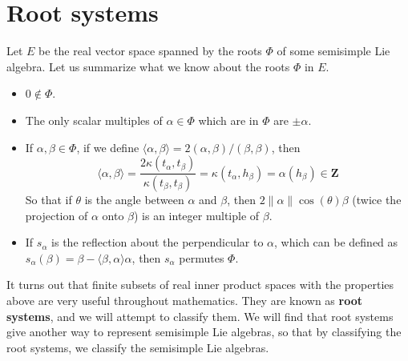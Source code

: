 \section{Root systems}

Let $E$ be the real vector space spanned by the roots $\Phi$ of some semisimple Lie algebra. Let us summarize what we know about the roots $\Phi$ in $E$.
%
\begin{itemize}
    \item $0 \not \in \Phi$.
    \item The only scalar multiples of $\alpha \in \Phi$ which are in $\Phi$ are $\pm \alpha$.
    \item If $\alpha, \beta \in \Phi$, if we define $\langle \alpha, \beta \rangle = 2 (\alpha, \beta) / (\beta, \beta)$, then
    \[ \langle \alpha, \beta \rangle = \frac{2 \kappa(t_\alpha, t_\beta)}{\kappa(t_\beta, t_\beta)} = \kappa(t_\alpha, h_\beta) = \alpha(h_\beta) \in \mathbf{Z} \]
    So that if $\theta$ is the angle between $\alpha$ and $\beta$, then $2 \| \alpha \| \cos(\theta) \beta$ (twice the projection of $\alpha$ onto $\beta$) is an integer multiple of $\beta$.
    \item If $s_\alpha$ is the reflection about the perpendicular to $\alpha$, which can be defined as $s_\alpha(\beta) = \beta - \langle \beta, \alpha \rangle \alpha$, then $s_\alpha$ permutes $\Phi$.
\end{itemize}
%
It turns out that finite subsets of real inner product spaces with the properties above are very useful throughout mathematics. They are known as {\bf root systems}, and we will attempt to classify them. We will find that root systems give another way to represent semisimple Lie algebras, so that by classifying the root systems, we classify the semisimple Lie algebras.


